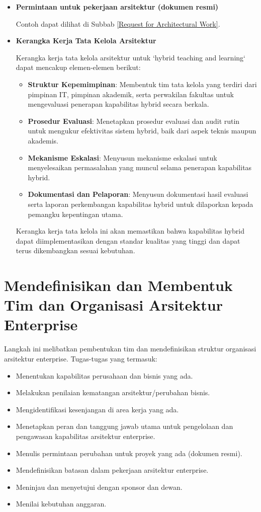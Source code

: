 \begin{itemize}
	\item \textbf{Permintaan untuk pekerjaan arsitektur (dokumen resmi)}
	
	Contoh dapat dilihat di Subbab \ref{Request for Architectural Work}.
	
	\item \textbf{Kerangka Kerja Tata Kelola Arsitektur}
	
	Kerangka kerja tata kelola arsitektur untuk `hybrid teaching and learning` dapat mencakup elemen-elemen berikut:
	\begin{itemize}
		\item \textbf{Struktur Kepemimpinan}: Membentuk tim tata kelola yang terdiri dari pimpinan IT, pimpinan akademik, serta perwakilan fakultas untuk mengevaluasi penerapan kapabilitas hybrid secara berkala.
		\item \textbf{Prosedur Evaluasi}: Menetapkan prosedur evaluasi dan audit rutin untuk mengukur efektivitas sistem hybrid, baik dari aspek teknis maupun akademis.
		\item \textbf{Mekanisme Eskalasi}: Menyusun mekanisme eskalasi untuk menyelesaikan permasalahan yang muncul selama penerapan kapabilitas hybrid.
		\item \textbf{Dokumentasi dan Pelaporan}: Menyusun dokumentasi hasil evaluasi serta laporan perkembangan kapabilitas hybrid untuk dilaporkan kepada pemangku kepentingan utama.
	\end{itemize}
	
	Kerangka kerja tata kelola ini akan memastikan bahwa kapabilitas hybrid dapat diimplementasikan dengan standar kualitas yang tinggi dan dapat terus dikembangkan sesuai kebutuhan.
\end{itemize}

\section{Mendefinisikan dan Membentuk Tim dan Organisasi Arsitektur Enterprise}
Langkah ini melibatkan pembentukan tim dan mendefinisikan struktur organisasi arsitektur enterprise. Tugas-tugas yang termasuk:

\begin{itemize}
	\item Menentukan kapabilitas perusahaan dan bisnis yang ada.
	\item Melakukan penilaian kematangan arsitektur/perubahan bisnis.
	\item Mengidentifikasi kesenjangan di area kerja yang ada.
	\item Menetapkan peran dan tanggung jawab utama untuk pengelolaan dan pengawasan kapabilitas arsitektur enterprise.
	\item Menulis permintaan perubahan untuk proyek yang ada (dokumen resmi).
	\item Mendefinisikan batasan dalam pekerjaan arsitektur enterprise.
	\item Meninjau dan menyetujui dengan sponsor dan dewan.
	\item Menilai kebutuhan anggaran.
\end{itemize}

